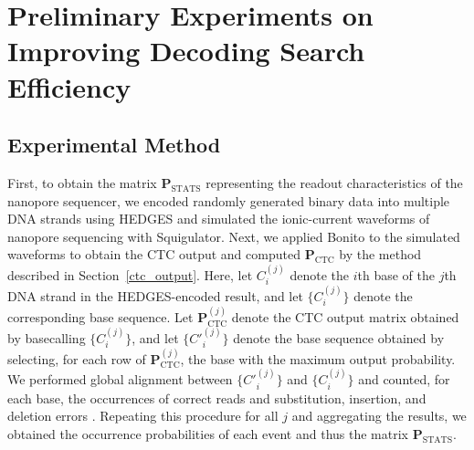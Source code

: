 \documentclass[sotsuron]{kuee}
\begin{document}





\appendix
\section{Preliminary Experiments on Improving Decoding Search Efficiency}
\subsection{Experimental Method}
First, to obtain the matrix $\bm{P}_{\mathrm{STATS}}$ representing the readout characteristics of
the nanopore sequencer, we encoded randomly generated binary data into multiple DNA strands using
HEDGES and simulated the ionic-current waveforms of nanopore sequencing with Squigulator.
Next, we applied Bonito to the simulated waveforms to obtain the CTC output and computed
$\bm{P}_{\mathrm{CTC}}$ by the method described in Section~\ref{ctc_output}.
Here, let $C_i^{(j)}$ denote the $i$th base of the $j$th DNA strand in the HEDGES-encoded result,
and let $\{C_i^{(j)}\}$ denote the corresponding base sequence.
Let $\bm{P}_{\mathrm{CTC}}^{(j)}$ denote the CTC output matrix obtained by basecalling
$\{C_i^{(j)}\}$, and let $\{C'^{{(j)}}_i\}$ denote the base sequence obtained by selecting,
for each row of $\bm{P}_{\mathrm{CTC}}^{(j)}$, the base with the maximum output probability.
We performed global alignment between $\{C'^{{(j)}}_i\}$ and $\{C_i^{(j)}\}$ and counted,
for each base, the occurrences of correct reads and substitution, insertion, and deletion errors
\cite{GOTOH1982705}.
Repeating this procedure for all $j$ and aggregating the results, we obtained the occurrence
probabilities of each event and thus the matrix $\bm{P}_{\mathrm{STATS}}$.
\end{document}
